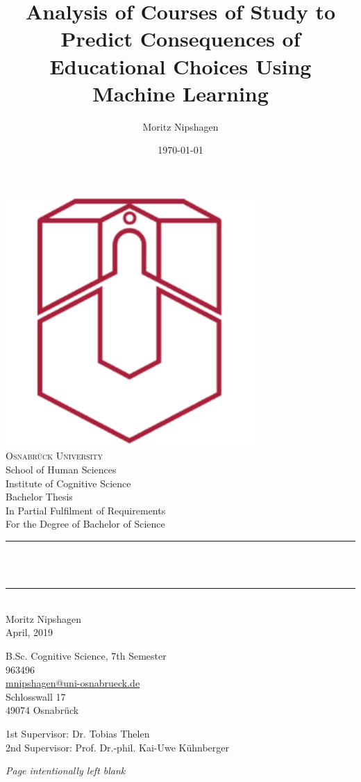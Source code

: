 \documentclass[fontsize=12pt]{scrartcl}
\title{Analysis of Courses of Study to Predict Consequences of Educational Choices Using Machine Learning}
\author{Moritz Nipshagen}
\date{\today}											%
\makeatletter
\let\thetitle\@title
\let\thedate\@date
\makeatother
\begin{document}
\begin{titlepage}
	{
		\centering
		\vspace*{0.5 cm}
		\includegraphics[scale = 0.25]{wappen.png}\\[1.0 cm]	%
		\textsc{\LARGE Osnabrück University}\\
		{\Large School of Human Sciences\\
		Institute of Cognitive Science}\\[1.0 cm]	%
		{\large Bachelor Thesis\\
		In Partial Fulfilment of Requirements\\
		For the Degree of Bachelor of Science}\\[0.5 cm]				%
		\rule{\linewidth}{0.2 mm} \\[0.4 cm]
		{ \LARGE \bfseries \thetitle }\\
		\rule{\linewidth}{0.2 mm} \\[0.75 cm]
		{\large 
			Moritz Nipshagen\\
			April, 2019\\
		}
	}
	\vfill
	{\noindent
		B.Sc. Cognitive Science, 7th Semester\\
		963496\\
		\href{mailto:mnipshagen@uos.de}{mnipshagen@uni-osnabrueck.de}\\
		Schlosswall 17\\
		49074 Osnabrück
	}
	\par
	{\noindent
		1st Supervisor: Dr. Tobias Thelen\\
		2nd Supervisor: Prof. Dr.-phil. Kai-Uwe Kühnberger
	}
	
	
	
\end{titlepage}
\pagebreak
\vspace*{\fill}
{
	\hfil \Large\textit{Page intentionally left blank} \hfil
}
\vspace*{\fill}
\end{document}
